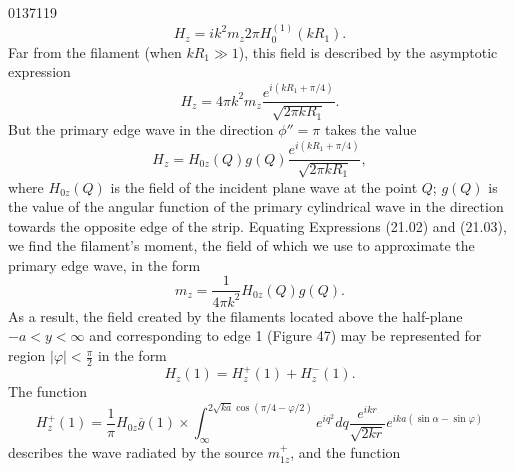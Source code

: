 \begin{scanpage}{0137}{119}
\[H_z=ik^2m_z2\pi H_0^{(1)}(kR_1).\tag{21.01}\]
Far from the filament (when $kR_1\gg1$), this field is described by the asymptotic expression
\[H_z=4\pi k^2m_z\frac{e^{i(kR_1+\pi/4)}}{\sqrt{2\pi kR_1}}.\tag{21.02}\]
But the primary edge wave in the direction $\phi''=\pi$ takes the value
\[H_z=H_{0z}(Q)g(Q)\frac{e^{i(kR_1+\pi/4)}}{\sqrt{2\pi kR_1}},\tag{21.03}\]
where $H_{0z}(Q)$ is the field of the incident plane wave at the point $Q$; $g(Q)$ is the value of the angular function of the primary cylindrical wave in the direction towards the opposite edge of the strip. Equating Expressions (21.02) and (21.03), we find the filament's moment, the field of which we use to approximate the primary edge wave, in the form
\[m_z=\frac1{4\pi k^2}H_{0z}(Q)g(Q).\tag{21.04}\]
As a result, the field created by the filaments located above the half-plane $-a<y<\infty$ and corresponding to edge 1 (Figure 47) may be represented for region $|\varphi|<\frac\pi2$ in the form
\[H_z(1)=H_z^+(1)+H_z^-(1).\tag{21.05}\]
The function
\[H_z^+(1)=\frac1\pi H_{0z}\overline g(1)\times\int_{\infty}^{2\sqrt{ka}\cos(\pi/4-\varphi/2)}e^{iq^2}dq\frac{e^{ikr}}{\sqrt{2kr}}e^{ika(\sin\alpha-\sin\varphi)}\tag{21.06}\]
describes the wave radiated by the source $m_{1z}^+$, and the function
\end{scanpage}
